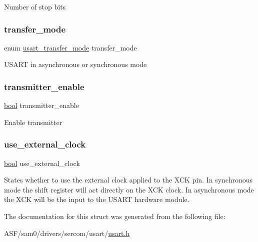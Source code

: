 Number of stop bits \mbox{\label{structusart__config_a6715fb00b24023ec771ff0f5bf0305d3}} 
\subsubsection{\texorpdfstring{transfer\_mode}{transfer\_mode}}
{\footnotesize\ttfamily enum \mbox{\hyperlink{group__asfdoc__sam0__sercom__usart__group_ga7ff4d85053b8ea0904b5a57587b39c8f}{usart\+\_\+transfer\+\_\+mode}} transfer\+\_\+mode}

U\+S\+A\+RT in asynchronous or synchronous mode \mbox{\label{structusart__config_a52ca09b63cefc4328e0d04225651d709}} 
\subsubsection{\texorpdfstring{transmitter\_enable}{transmitter\_enable}}
{\footnotesize\ttfamily \mbox{\hyperlink{group__group__sam0__utils_ga97a80ca1602ebf2303258971a2c938e2}{bool}} transmitter\+\_\+enable}

Enable transmitter \mbox{\label{structusart__config_a89f38baff20ec53160e32c3343fe4f92}} 
\subsubsection{\texorpdfstring{use\_external\_clock}{use\_external\_clock}}
{\footnotesize\ttfamily \mbox{\hyperlink{group__group__sam0__utils_ga97a80ca1602ebf2303258971a2c938e2}{bool}} use\+\_\+external\+\_\+clock}

States whether to use the external clock applied to the X\+CK pin. In synchronous mode the shift register will act directly on the X\+CK clock. In asynchronous mode the X\+CK will be the input to the U\+S\+A\+RT hardware module. 

The documentation for this struct was generated from the following file\+:\begin{DoxyCompactItemize}
\item 
A\+S\+F/sam0/drivers/sercom/usart/\mbox{\hyperlink{usart_8h}{usart.\+h}}\end{DoxyCompactItemize}

